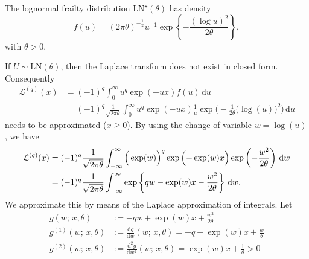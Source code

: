 The lognormal frailty distribution $\mathrm{LN}^\star(\theta)$ has density
\begin{equation}
    f(u) = (2\pi\theta)^{-\frac12} u^{-1} \exp\left\{-\frac{(\log u)^2}{2\theta} \right\},
\end{equation}
with $\theta > 0$.

If $U \sim \text{LN}(\theta)$, then the Laplace transform does not exist in closed form.
Consequently
\begin{align*}
\mathcal{L}^{(q)}(x)
 & = (-1)^q \int_0^\infty u^q \exp(-u x) f(u) \, \textrm{d}u \\
 & = (-1)^q \frac{1}{\sqrt{2 \pi \theta}} \int_0^\infty u^q \exp(-u x) \frac{1}{u} 
 \exp \bigg( - \frac{1}{2 \theta} \Big( \log(u) \Big)^2 \bigg) \, \textrm{d}u
\end{align*}
needs to be approximated ($x \geq 0$). By using the change of variable $w = \log(u)$, we have
\begin{align*}
\mathcal{L}^{(q)}(x)
  & = (-1)^q \frac{1}{\sqrt{2 \pi \theta}} \int_{-\infty}^\infty 
  \Big( \exp(w) \Big)^q \exp \left( -\exp(w) x \vphantom{\Big)} \right) \exp \left( - \frac{w^2}{2\theta} \right) \, \textrm{d}w \\
  & = (-1)^q \frac{1}{\sqrt{2 \pi \theta}} \int_{-\infty}^\infty \exp \left\{ qw - \exp(w) x - \frac{w^2}{2 \theta} \right\} \, \textrm{d}w.
\end{align*}
We approximate this by means of the Laplace approximation of integrals.
Let 
\begin{align*}
g(w;\, x, \theta)       & := - qw + \exp(w) x + \frac{w^2}{2 \theta} \\
g^{(1)}(w;\, x, \theta) & := \frac{\textrm{d} g}{\textrm{d} w}(w;\, x, \theta) = - q + \exp(w) x + \frac{w}{\theta}\\
g^{(2)}(w;\, x, \theta) & := \frac{\textrm{d}^2 g}{\textrm{d} w^2}(w;\, x, \theta) =  \exp(w) x + \frac{1}{\theta} > 0 
\end{align*}

